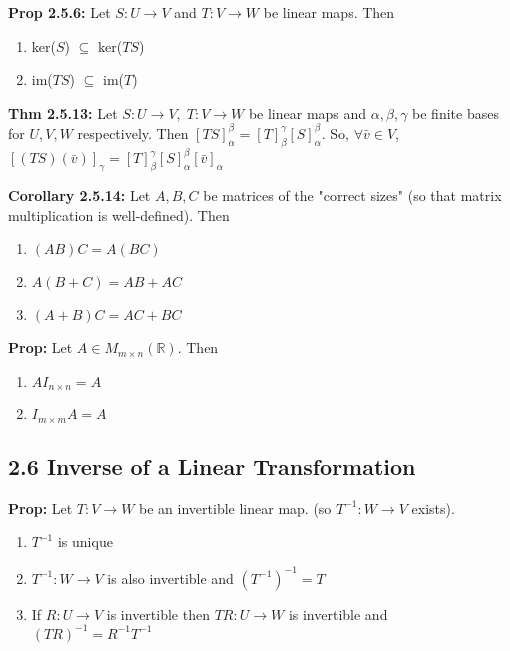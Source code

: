 \bigskip 

\noindent 
\textbf{Prop 2.5.6:} Let $S: U \rightarrow V$ and $T: V \rightarrow W$ be linear maps. Then 
\begin{enumerate}
    \item ker($S$) $\subseteq$ ker($TS$)
    \item im($TS$) $\subseteq$ im($T$)
\end{enumerate}

\bigskip 

\noindent 
\textbf{Thm 2.5.13:} Let $S: U \rightarrow V, \; T: V \rightarrow W$ be linear maps and $\alpha, \beta, \gamma$ be finite bases for $U, V, W$ respectively. 
Then $[TS]_\alpha^\beta = [T]_\beta^\gamma[S]_\alpha^\beta$. 
So, $\forall \bar v \in V$, $[(TS)(\bar v)]_\gamma = [T]_\beta^\gamma[S]_\alpha^\beta[\bar v]_\alpha$

\bigskip 

\noindent 
\textbf{Corollary 2.5.14:} Let $A, B, C$ be matrices of the "correct sizes" (so that matrix multiplication is well-defined). Then 
\begin{enumerate}
    \item $(AB)C = A(BC)$
    \item $A(B + C) = AB + AC$
    \item $(A + B)C = AC + BC$
\end{enumerate}

\bigskip 
\noindent
\textbf{Prop:} Let $A \in M_{m \times n}(\mathbb{R})$. Then 
\begin{enumerate}
    \item $AI_{n \times n} = A$ 
    \item $I_{m \times m}A = A$
\end{enumerate}

\subsection*{2.6 Inverse of a Linear Transformation}

\textbf{Prop:} Let $T: V \rightarrow W$ be an invertible linear map. (so $T^{-1}: W \rightarrow V$ exists).
\begin{enumerate}
    \item $T^{-1}$ is unique 
    \item $T^{-1}: W \rightarrow V$ is also invertible and $(T^{-1})^{-1} = T$
    \item If $R: U \rightarrow V$ is invertible then $TR: U \rightarrow W$ is invertible and $(TR)^{-1} = R^{-1}T^{-1}$
\end{enumerate}

